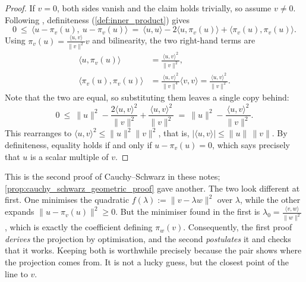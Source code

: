 \begin{proof}
If $v = 0$, both sides vanish and the claim holds trivially, so assume $v \neq 0$. Following
, definiteness (\cref{def:inner_product}) gives
\[
  0 \ \leq\ \langle u-\pi_v(u),\ u-\pi_v(u)\rangle
    \ =\ \langle u,u\rangle - 2\langle u,\pi_v(u)\rangle + \langle \pi_v(u),\pi_v(u)\rangle.
\]
Using $\pi_v(u) = \tfrac{\langle u,v\rangle}{\|v\|^2}v$ and bilinearity, the two right-hand terms
are
\begin{align*}
  \langle u,\pi_v(u)\rangle &= \frac{\langle u,v\rangle^2}{\|v\|^2}, \\[0.3ex]
  \langle \pi_v(u),\pi_v(u)\rangle
    &= \frac{\langle u,v\rangle^2}{\|v\|^4}\langle v,v\rangle
     = \frac{\langle u,v\rangle^2}{\|v\|^2}.
\end{align*}
Note that the two are equal, so substituting them leaves a single copy behind:
\[
  0 \ \leq\ \|u\|^2 - \frac{2\langle u,v\rangle^2}{\|v\|^2} + \frac{\langle u,v\rangle^2}{\|v\|^2}
    \ =\ \|u\|^2 - \frac{\langle u,v\rangle^2}{\|v\|^2}.
\]
This rearranges to $\langle u,v\rangle^2 \leq \|u\|^2\|v\|^2$, that is,
$|\langle u,v\rangle| \leq \|u\|\,\|v\|$. By definiteness, equality holds if and only if
$u - \pi_v(u) = 0$, which says precisely that $u$ is a scalar multiple of $v$.
\end{proof}

\begin{remark}
\label{rem:two_proofs_cauchy_schwarz}
This is the second proof of Cauchy--Schwarz in these notes;
\cref{prop:cauchy_schwarz_geometric_proof} gave another.
The two look different at first. One minimises the quadratic
$f(\lambda) := \|v-\lambda w\|^2$ over $\lambda$, while the other expands
$\|u-\pi_v(u)\|^2 \geq 0$. But the minimiser found in the first is
$\lambda_0 = \tfrac{\langle v,w\rangle}{\|w\|^2}$, which is exactly the coefficient defining
$\pi_w(v)$. Consequently, the first proof \emph{derives} the projection by optimisation, and the
second \emph{postulates} it and checks that it works. Keeping both is worthwhile precisely because
the pair shows where the projection comes from. It is not a lucky guess, but the closest point of
the line to $v$.
\end{remark}

